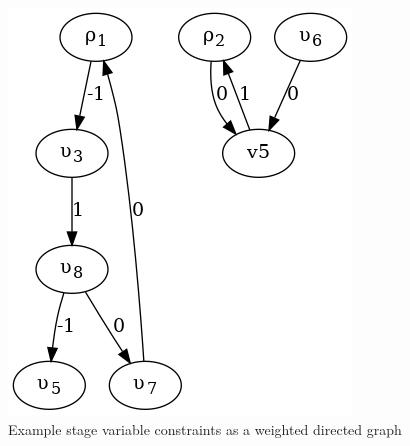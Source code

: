 \begin{figure}
    \centering
    \includegraphics[width=0.3\linewidth]{figures/digraph.png}
\caption{Example stage variable constraints as a weighted directed graph}
\label{fig:digraph}
\end{figure}